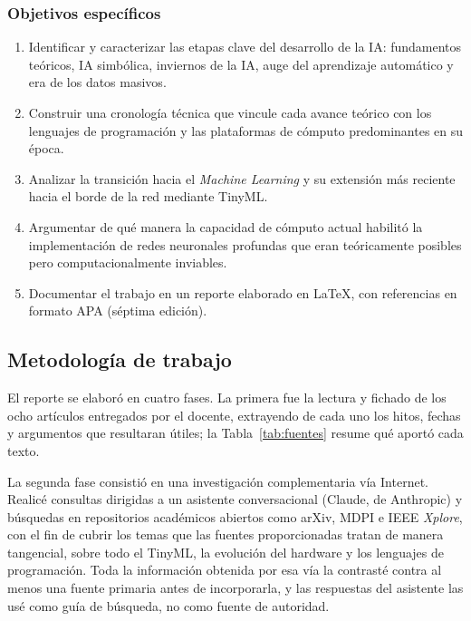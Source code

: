 \documentclass[12pt,letterpaper,oneside]{article}
\begin{document}
\subsubsection{Objetivos específicos}

\begin{enumerate}[label=\alph*),leftmargin=1.6cm,itemsep=0.2em]
  \item Identificar y caracterizar las etapas clave del desarrollo de la IA: fundamentos teóricos, IA simbólica, inviernos de la IA, auge del aprendizaje automático y era de los datos masivos.
  \item Construir una cronología técnica que vincule cada avance teórico con los lenguajes de programación y las plataformas de cómputo predominantes en su época.
  \item Analizar la transición hacia el \textit{Machine Learning} y su extensión más reciente hacia el borde de la red mediante TinyML.
  \item Argumentar de qué manera la capacidad de cómputo actual habilitó la implementación de redes neuronales profundas que eran teóricamente posibles pero computacionalmente inviables.
  \item Documentar el trabajo en un reporte elaborado en \LaTeX{}, con referencias en formato APA (séptima edición).
\end{enumerate}

\subsection{Metodología de trabajo}

El reporte se elaboró en cuatro fases. La primera fue la lectura y fichado de los ocho artículos entregados por el docente, extrayendo de cada uno los hitos, fechas y argumentos que resultaran útiles; la Tabla~\ref{tab:fuentes} resume qué aportó cada texto.

La segunda fase consistió en una investigación complementaria vía Internet. Realicé consultas dirigidas a un asistente conversacional (Claude, de Anthropic) y búsquedas en repositorios académicos abiertos como arXiv, MDPI e IEEE \textit{Xplore}, con el fin de cubrir los temas que las fuentes proporcionadas tratan de manera tangencial, sobre todo el TinyML, la evolución del hardware y los lenguajes de programación. Toda la información obtenida por esa vía la contrasté contra al menos una fuente primaria antes de incorporarla, y las respuestas del asistente las usé como guía de búsqueda, no como fuente de autoridad.
\end{document}
